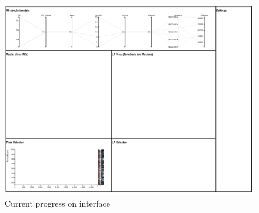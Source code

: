 \documentclass[12pt]{article}
\begin{document}
\begin{figure}[t]
\centering
   \includegraphics[width=6.5in]{current.png}
\caption{Current progress on interface}
\label{current}
\end{figure}






%

%
%


\end{document}
